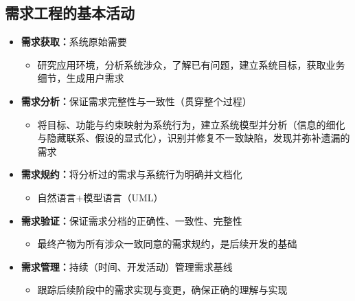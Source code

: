 \subsection{需求工程的基本活动}
\begin{itemize}
    \item \textbf{需求获取：}系统原始需要
    \begin{itemize}
        \item 研究应用环境，分析系统涉众，了解已有问题，建立系统目标，获取业务细节，生成用户需求
    \end{itemize}
    \item \textbf{需求分析：}保证需求完整性与一致性（贯穿整个过程）
    \begin{itemize}
        \item 将目标、功能与约束映射为系统行为，建立系统模型并分析（信息的细化与隐藏联系、假设的显式化），识别并修复不一致缺陷，发现并弥补遗漏的需求
    \end{itemize}
    \item \textbf{需求规约：}将分析过的需求与系统行为明确并文档化
    \begin{itemize}
        \item 自然语言$+$模型语言（UML）
    \end{itemize}
    \item \textbf{需求验证：}保证需求分档的正确性、一致性、完整性
    \begin{itemize}
        \item 最终产物为所有涉众一致同意的需求规约，是后续开发的基础
    \end{itemize}
    \item \textbf{需求管理：}持续（时间、开发活动）管理需求基线
    \begin{itemize}
        \item 跟踪后续阶段中的需求实现与变更，确保正确的理解与实现
    \end{itemize}
\end{itemize}

